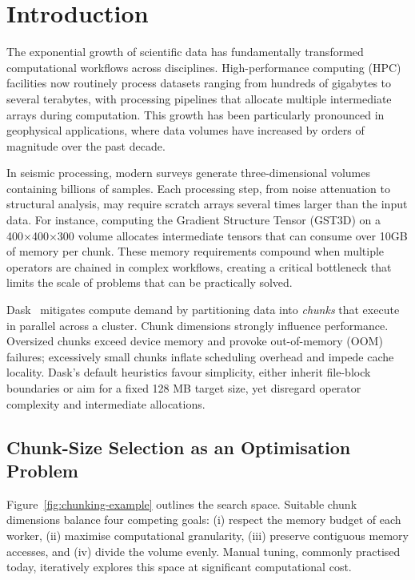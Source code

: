 \section{Introduction}
\label{sec:introduction}

The exponential growth of scientific data has fundamentally transformed computational workflows across disciplines.
High-performance computing (\ac{HPC}) facilities now routinely process datasets ranging from hundreds of gigabytes to several terabytes, with processing pipelines that allocate multiple intermediate arrays during computation.
This growth has been particularly pronounced in geophysical applications, where data volumes have increased by orders of magnitude over the past decade.

In seismic processing, modern surveys generate three-dimensional volumes containing billions of samples.
Each processing step, from noise attenuation to structural analysis, may require scratch arrays several times larger than the input data.
For instance, computing the Gradient Structure Tensor (\ac{GST3D}) on a 400×400×300 volume allocates intermediate tensors that can consume over 10\ac{GB} of memory per chunk.
These memory requirements compound when multiple operators are chained in complex workflows, creating a critical bottleneck that limits the scale of problems that can be practically solved.

Dask~\cite{rocklin2015dask} mitigates compute demand by partitioning data into \emph{chunks} that execute in parallel across a cluster.
Chunk dimensions strongly influence performance.
Oversized chunks exceed device memory and provoke out-of-memory (\ac{OOM}) failures; excessively small chunks inflate scheduling overhead and impede cache locality.
Dask's default heuristics favour simplicity, either inherit file-block boundaries or aim for a fixed 128 \ac{MB} target size, yet disregard operator complexity and intermediate allocations.

\subsection{Chunk-Size Selection as an Optimisation Problem}

Figure~\ref{fig:chunking-example} outlines the search space.
Suitable chunk dimensions balance four competing goals: (i) respect the memory budget of each worker, (ii) maximise computational granularity, (iii) preserve contiguous memory accesses, and (iv) divide the volume evenly.
Manual tuning, commonly practised today, iteratively explores this space at significant computational cost.

